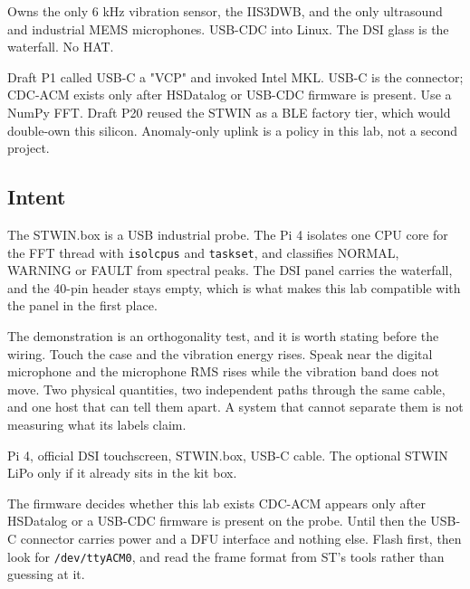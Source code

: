 
\begin{unique}
Owns the only 6 kHz vibration sensor, the IIS3DWB, and the only ultrasound and industrial MEMS microphones. USB-CDC into Linux. The DSI glass is the waterfall. No HAT.
\end{unique}

\begin{blueprint}
Draft P1 called USB-C a "VCP" and invoked Intel MKL. USB-C is the connector; CDC-ACM exists only after HSDatalog or USB-CDC firmware is present. Use a NumPy FFT. Draft P20 reused the STWIN as a BLE factory tier, which would double-own this silicon. Anomaly-only uplink is a policy in this lab, not a second project.
\end{blueprint}

\subsection*{Intent}

The STWIN.box is a USB industrial probe. The Pi 4 isolates one CPU core for the FFT thread with \texttt{isolcpus} and \texttt{taskset}, and classifies NORMAL, WARNING or FAULT from spectral peaks. The DSI panel carries the waterfall, and the 40-pin header stays empty, which is what makes this lab compatible with the panel in the first place.

The demonstration is an orthogonality test, and it is worth stating before the wiring. Touch the case and the vibration energy rises. Speak near the digital microphone and the microphone RMS rises while the vibration band does not move. Two physical quantities, two independent paths through the same cable, and one host that can tell them apart. A system that cannot separate them is not measuring what its labels claim.

\begin{kit}
Pi 4, official DSI touchscreen, STWIN.box, USB-C cable. The optional STWIN LiPo only if it already sits in the kit box.
\end{kit}

\begin{note}{The firmware decides whether this lab exists}
CDC-ACM appears only after HSDatalog or a USB-CDC firmware is present on the probe. Until then the USB-C connector carries power and a DFU interface and nothing else. Flash first, then look for \texttt{/dev/ttyACM0}, and read the frame format from ST's tools rather than guessing at it.
\end{note}

